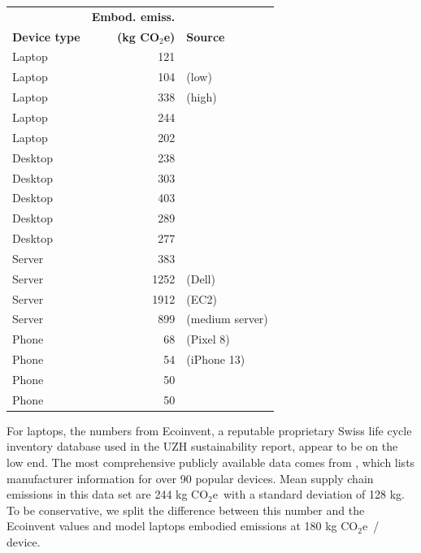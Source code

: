 \documentclass[11pt]{article}
\newcommand{\coe}{CO$_2$e}
\newcommand{\gcoe}{g \coe}
\newcommand{\kgcoe}{k\gcoe}
\begin{document}
\begin{center}
  \begin{tabular}{|l|r|l|}
    \hline
    & \textbf{Embod. emiss.} & \\
    \textbf{Device type} & \textbf{(\kgcoe)} & \textbf{Source} \\ \hline
    Laptop & 121 & \textcite{ecoinvent}  \\ \hline
    Laptop & 104 & \textcite{teehan2013} (low) \\ \hline
    Laptop & 338 & \textcite{teehan2013} (high) \\ \hline
    Laptop & 244 & \textcite{rarecoil} \\ \hline
    Laptop & 202 & \textcite{unctadder2024} \\ \hline
    Desktop & 238 & \textcite{ecoinvent} \\ \hline
    Desktop & 303 & \textcite{teehan2013} \\ \hline
    Desktop & 403 & \textcite{unctadder2024} \\ \hline
    Desktop & 289 & \textcite{dellpcf} \\ \hline
    Desktop & 277 & \textcite{boavizta:api} \\ \hline
    Server & 383 & \textcite{teehan2013} \\ \hline
    Server & 1252 & \textcite{davy2021} (Dell) \\ \hline
    Server & 1912 & \textcite{davy2021} (EC2) \\ \hline
    Server & 899 & \textcite{boavizta:api} (medium server)\\ \hline
    Phone & 68 & \textcite{googlepixel8} (Pixel 8)\\ \hline
    Phone & 54 & \textcite{appleiphone13} (iPhone 13)\\ \hline
    Phone & 50 & \textcite{unctadder2024} \\ \hline
    Phone & 50 & \textcite{lovehagen2023} \\ \hline
    \end{tabular}
  \label{tab:embodied_emissions}
\end{center}

For laptops, the numbers from Ecoinvent, a reputable proprietary Swiss life cycle inventory database used in the UZH sustainability report, appear to be on the low end. The most comprehensive publicly available data comes from \textcite{rarecoil}, which lists manufacturer information for over 90 popular devices. Mean supply chain emissions in this data set are 244 \kgcoe\ with a standard deviation of 128 kg. To be conservative, we split the difference between this number and the Ecoinvent values and model laptops embodied emissions at 180 \kgcoe\ / device.
\end{document}
